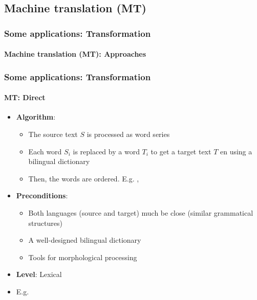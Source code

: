 \documentclass[xcolor=table]{beamer}
\begin{document}
\subsection{Machine translation (MT)}

\begin{frame}
	\frametitle{Some applications: Transformation}
	\framesubtitle{Machine translation (MT): Approaches}
\end{frame}

\begin{frame}
	\frametitle{Some applications: Transformation}
	\framesubtitle{MT: Direct}
	\begin{itemize}
		\item \textbf{Algorithm}:
		\begin{itemize}
			\item The source text $S$ is processed as word series
			\item Each word $S_i$ is replaced by a word $T_i$ to get a target text $T$ en using a bilingual dictionary			
			\item Then, the words are ordered. E.g. , 
		\end{itemize}
		\item \textbf{Preconditions}:
		\begin{itemize}
			\item Both languages (source and target) much be close (similar grammatical structures)
			\item A well-designed bilingual dictionary
			\item Tools for morphological processing
		\end{itemize}
		\item \textbf{Level}: Lexical 
		\item E.g. 
	\end{itemize}
\end{frame}
\end{document}
